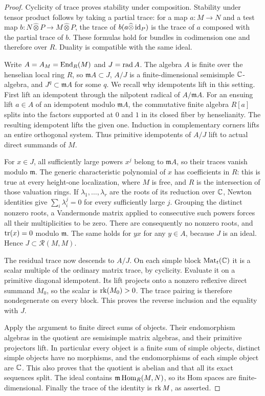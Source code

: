 \begin{proof}
Cyclicity of trace proves stability under composition.  Stability
under tensor product follows by taking a partial trace: for a map
$a:M\to N$ and a test map
$b:N\widehat\otimes P\to M\widehat\otimes P$, the trace of
$b(a\widehat\otimes\operatorname{id}_P)$ is the trace of $a$ composed with the
partial trace of $b$.  These formulas hold for bundles in codimension
one and therefore over $R$.  Duality is compatible with the same
ideal.

Write $A=A_M=\operatorname{End}_R(M)$ and $J=\operatorname{rad} A$.  The algebra $A$ is finite over
the henselian local ring $R$, so $\mathfrak m A\subset J$,
$A/J$ is a finite-dimensional semisimple $\mathbb C$-algebra, and
$J^q\subset\mathfrak m A$ for some $q$.  We recall why idempotents
lift in this setting.  First lift an idempotent through the nilpotent
radical of $A/\mathfrak m A$.  For an ensuing lift $a\in A$ of an
idempotent modulo $\mathfrak m A$, the commutative finite algebra
$R[a]$ splits into the factors supported at $0$ and $1$ in its
closed fiber by henselianity.  The resulting idempotent lifts the
given one.  Induction in complementary corners lifts an entire
orthogonal system.  Thus primitive idempotents of $A/J$ lift to
actual direct summands of $M$.

For $x\in J$, all sufficiently large powers $x^j$ belong to
$\mathfrak m A$, so their traces vanish modulo $\mathfrak m$.
The generic characteristic polynomial of $x$ has coefficients in
$R$: this is true at every height-one localization, where $M$ is
free, and $R$ is the intersection of those valuation rings.  If
$\lambda_1,\ldots,\lambda_r$ are the roots of its reduction over
$\mathbb C$, Newton identities give
$\sum_i\lambda_i^j=0$ for every sufficiently large $j$.
Grouping the distinct nonzero roots, a Vandermonde matrix applied to
consecutive such powers forces all their multiplicities to be zero.
There are consequently no nonzero roots, and $\operatorname{tr}(x)=0$ modulo
$\mathfrak m$.  The same holds for $yx$ for any $y\in A$, because
$J$ is an ideal.  Hence $J\subset\mathcal R(M,M)$.

The residual trace now descends to $A/J$.  On each simple block
$\operatorname{Mat}_t(\mathbb C)$ it is a scalar multiple of the ordinary
matrix trace, by cyclicity.  Evaluate it on a primitive diagonal
idempotent.  Its lift projects onto a nonzero reflexive direct
summand $M_0$, so the scalar is $\operatorname{rk}(M_0)>0$.  The trace pairing is
therefore nondegenerate on every block.  This proves the reverse
inclusion and the equality with $J$.

Apply the argument to finite direct sums of objects.  Their
endomorphism algebras in the quotient are semisimple matrix algebras,
and their primitive projectors lift.  In particular every object is
a finite sum of simple objects, distinct simple objects have no
morphisms, and the endomorphisms of each simple object are $\mathbb C$.
This also proves that the quotient is abelian and that all its exact
sequences split.  The ideal contains $\mathfrak m\operatorname{Hom}_R(M,N)$,
so its Hom spaces are finite-dimensional.  Finally the trace of the
identity is $\operatorname{rk} M$, as asserted.
\end{proof}


